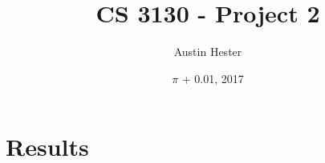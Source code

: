 \documentclass{article}
\begin{document}
\title{CS 3130 - Project 2}
\author{Austin Hester}
\date{$\pi$ + 0.01, 2017}
\maketitle


\makeatletter
\def\@seccntformat#1{%
	 \expandafter\ifx\csname c@#1\endcsname\c@section\else
	  \csname the#1\endcsname\quad
  \fi}
\makeatother



\section{Results}
\end{document}
